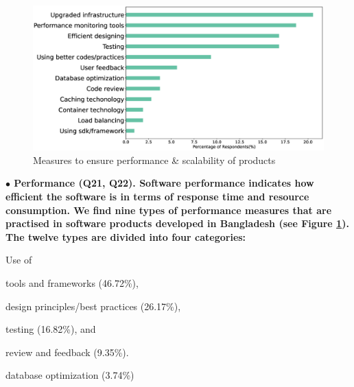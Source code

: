 \begin{figure}[h]
\centering
\includegraphics[scale=0.22]{Figures/PerformanceScalability.eps} 
\caption{Measures to ensure performance \& scalability of products}
\label{fig:Measures to ensure performance and scalability}
\end{figure}
\nd\bf{$\bullet$ Performance (Q21, Q22).} Software performance indicates how efficient the software is in terms of response time and resource consumption. 
We find nine types of performance measures that are practised in software products developed in Bangladesh (see Figure \ref{fig:Measures to ensure performance and scalability}).  
The twelve types are divided into four categories: 
\begin{inparaenum}
Use of \item tools and frameworks (46.72\%),
\item design principles/best practices (26.17\%),
\item testing (16.82\%), and
\item review and feedback (9.35\%).
\item database optimization (3.74\%)
\end{inparaenum} 

